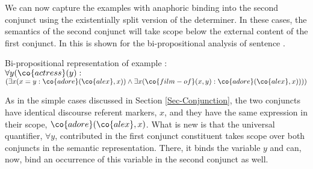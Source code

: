 \documentclass[output=paper]{langsci/langscibook}
\begin{document}


We can now capture the examples with anaphoric binding into the second conjunct using the existentially split version of the determiner. 
In these cases, the semantics of the second conjunct will take scope below the external content of the first conjunct. 
In  this is shown for the bi-propositional analysis of sentence . 

\ea \label{bi-every-ana2}
Bi-propositional representation of example :\\[1ex]
$
\forall y (\co{actress}(y) : $\\
\hspace*{3em}$(\exists x (x = y : \co{adore}(\co{alex},x))
\land
\exists x (\co{film-of}(x,y) : \co{adore}(\co{alex},x))
))$
\z 



As in the simple cases discussed in Section \ref{Sec-Conjunction}, the two conjuncts have identical discourse referent markers, $x$, and they have the same expression in  their scope, $\co{adore}(\co{alex},x)$.
What is new is that 
the universal quantifier, $\forall y$, contributed in the first conjunct constituent takes scope over both conjuncts in the semantic representation.
There, it binds the variable $y$ and can, now, bind an occurrence of this variable in the second conjunct as well.




\end{document}
